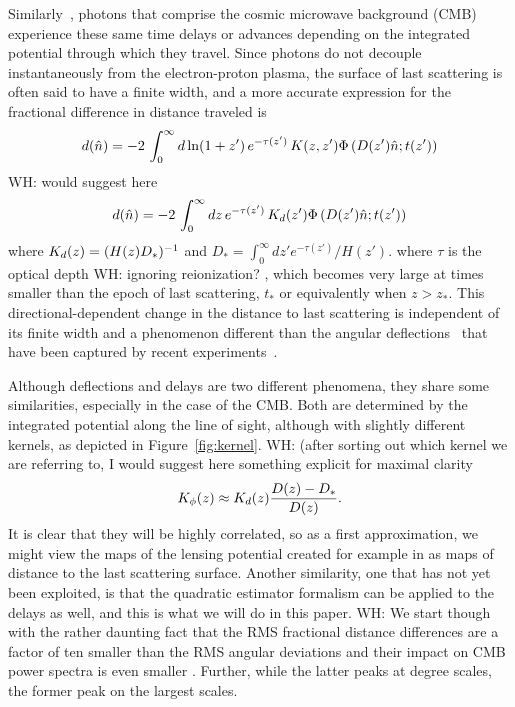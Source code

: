 \documentclass[prl,amsmath,amssymb,floatfix,superscriptaddress,nofootinbib,twocolumn]{revtex4-1}
\def\be{\begin{equation}}
\def\ee{\end{equation}}
\newcommand{\rf}[1]{\ref{fig:#1}}
\newcommand{\wh}[1]{{\color{red} WH: #1}}
\begin{document}
Similarly~\cite{Hu:2001yq}, photons that comprise the cosmic microwave background (CMB) experience these same time delays or advances depending on the integrated potential through which they travel. Since photons do not decouple instantaneously from the electron-proton plasma, the surface of last scattering is often said to have a finite width, and a more accurate expression for the fractional difference in distance traveled is
\be
\fd(\hat n) = -2\, \int_0^{\infty} d\ln(1+z')\, e^{-\tau(z')}\, K(z,z')\Phi\left(D(z')\hat n; t(z')\right)
\ee
\wh{would suggest here 
\be
\fd(\hat n) = -2\, \int_0^{\infty} dz \, e^{-\tau(z')}\, K_\fd(z')\Phi\left(D(z')\hat n; t(z')\right)
\ee
where $K_d(z) = (H(z)D_*)^{-1}$ and $D_* =  \int_0^\infty dz' e^{-\tau(z') }/H(z')$.}
where $\tau$ is the optical depth \wh{ignoring reionization? }, which becomes very large at times smaller than the epoch of  last scattering, $t_*$ or equivalently when $z>z_*$.
This directional-dependent change in the distance to last scattering is independent of its finite width and a phenomenon different than the angular deflections~\cite{Hu:2001tn,Lewis:2006fu} that have been captured by recent experiments~\cite{Smith:2007rg,Ade:2013tyw,Story:2014hni,Sherwin:2016tyf,Aghanim:2018oex}.

Although deflections and delays are two different phenomena, they share some similarities, especially in the case of the CMB. Both are determined by the integrated potential along the line of sight, although with slightly different kernels, as depicted in Figure~\rf{kernel}.
\wh{(after sorting out which kernel we are referring to, I would suggest here something explicit for maximal clarity
\be
K_\phi(z) \approx K_\fd(z)  \frac{D(z)-D_*}{ D(z) } .
\ee}
 It is clear that they will be highly correlated, so as a first approximation, we might view the maps of the lensing potential created for example in \citet{Aghanim:2018oex} as maps of distance to the last scattering surface. Another similarity, one that has not yet been exploited, is that the quadratic estimator formalism  \cite{Hu:2001tn} can be applied to the delays as well, and this is what we will do in this paper.  \wh{We start though with the rather daunting fact that the RMS fractional distance differences are a factor of ten smaller than the RMS angular deviations 
 and their impact on CMB power spectra is even smaller \cite{Hu:2001yq}.} Further, while the latter peaks at degree scales, the former peak on the largest scales.
\end{document}
